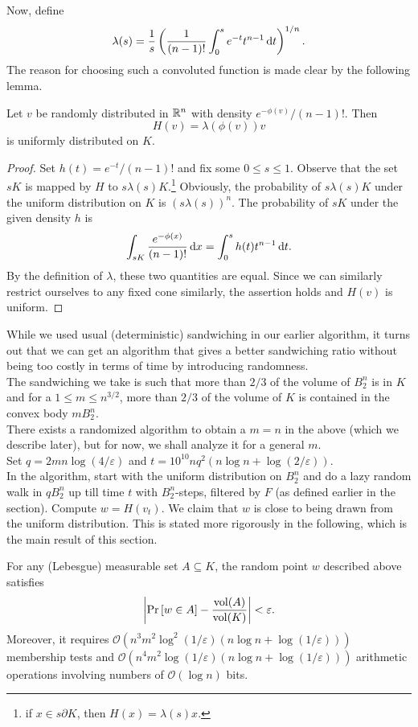 Now, define
\[ \lambda(s) = \frac{1}{s}\left(\frac{1}{(n-1)!}\int_0^s e^{-t}t^{n-1}\operatorname{d}\!{t}\right)^{1/n}. \]
The reason for choosing such a convoluted function is made clear by the following lemma.
\begin{lemma}
	\label{final thing uniformly distrib}
	Let $v$ be randomly distributed in $\mathbb{R}^n$ with density $e^{-\phi(v)}/(n-1)!$. Then
	\[ H(v) = \lambda(\phi(v))v \]
	is uniformly distributed on $K$.
\end{lemma}
\begin{proof}
	Set $h(t)=e^{-t}/(n-1)!$ and fix some $0\leq s\leq 1$. Observe that the set $sK$ is mapped by $H$ to $s\lambda(s)K$.\footnote{if $x\in s\partial K$, then $H(x)=\lambda(s)x$.} Obviously, the probability of $s\lambda(s)K$ under the uniform distribution on $K$ is $(s\lambda(s))^n$. The probability of $sK$ under the given density $h$ is
	\[ \int_{sK} \frac{e^{-\phi(x)}}{(n-1)!} \operatorname{d}\!{x} = \int_0^s h(t) t^{n-1} \operatorname{d}\!{t}. \]
	By the definition of $\lambda$, these two quantities are equal. Since we can similarly restrict ourselves to any fixed cone similarly, the assertion holds and $H(v)$ is uniform.
\end{proof}


While we used usual (deterministic) sandwiching in our earlier algorithm, it turns out that we can get an algorithm that gives a better sandwiching ratio without being too costly in terms of time by introducing randomness.\\

The sandwiching we take is such that more than $2/3$ of the volume of $B_2^n$ is in $K$ and for a $1\leq m\leq n^{3/2}$, more than $2/3$ of the volume of $K$ is contained in the convex body $mB_2^n$.\\
There exists a randomized algorithm to obtain a $m=n$ in the above (which we describe later), but for now, we shall analyze it for a general $m$.\\

Set $q=2mn\log(4/\varepsilon)$ and $t=10^{10}nq^2(n\log n + \log(2/\varepsilon))$.\\
In the algorithm, start with the uniform distribution on $B_2^n$ and do a lazy random walk in $qB_2^n$ up till time $t$ with $B_2^n$-steps, filtered by $F$ (as defined earlier in the section). Compute $w=H(v_t)$. We claim that $w$ is close to being drawn from the uniform distribution. This is stated more rigorously in the following, which is the main result of this section.

\begin{ftheo}
	\label{LovS algorithm works!}
	For any (Lebesgue) measurable set $A\subseteq K$, the random point $w$ described above satisfies
	\[ \left| \Pr\left[w\in A\right] - \frac{\operatorname{vol}(A)}{\operatorname{vol}(K)} \right| < \varepsilon. \]
	Moreover, it requires $\mathcal{O}(n^3m^2\log^2(1/\varepsilon)(n\log n + \log(1/\varepsilon)))$ membership tests and $\mathcal{O}(n^4 m^2 \log(1/\varepsilon) (n\log n + \log(1/\varepsilon)))$ arithmetic operations involving numbers of $\mathcal{O}(\log n)$ bits.
\end{ftheo}

